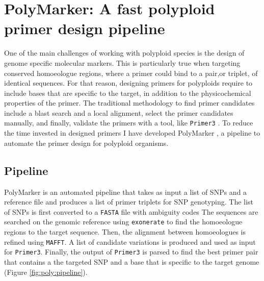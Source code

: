 
\chapter{PolyMarker: A fast polyploid primer design pipeline}
One of the main challenges of working with polyploid species is the design of genome specific molecular markers. 
This is particularly true when targeting conserved homoeologue regions, where a primer could bind to a pair,or triplet, of identical sequences. 
For that reason, designing primers for polyploids require to include bases that are specific to the target, in addition to the physicochemical properties of the primer.  
The traditional methodology to find primer candidates include a blast search and a local alignment, select the primer candidates manually, and finally, validate the primers with a tool, like \texttt{Primer3} \citep{Rozen}. 
To reduce the time invested in designed primers I have developed PolyMarker \citep{Ramirez-Gonzalez2015a}, a pipeline to automate the primer design for polyploid organisms.  

\section{Pipeline}
PolyMarker is an automated pipeline that takes as input a list of SNPs and a reference file and produces a list of primer triplets for SNP genotyping. 
The list of SNPs is first converted to a \texttt{FASTA} file with ambiguity codes\citep{Cornish-Bowden1985} 
The sequences are searched on the genomic reference using \texttt{exonerate}\citep{Slater2005} to find the homoeologue regions to the target sequence. 
Then, the alignment between homoeologues is refined using \texttt{MAFFT}\citep{Katoh2013}. 
A list of candidate variations is produced and used as input for \texttt{Primer3}\citep{Rozen}. 
Finally, the output of \texttt{Primer3} is parsed to find the best primer pair that contains a the targeted SNP and a base that is specific to the target genome (Figure \ref{fig:poly:pipeline}).  

